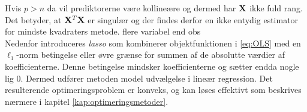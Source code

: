 Hvis \(p > n\) da vil prediktorerne være kollineære og dermed har \(\mathbf{X}\) ikke fuld rang.
Det betyder, at $\mathbf{X}^T \mathbf{X}$ er singulær og der findes derfor en ikke entydig estimator for mindste kvadraters metode.
flere variabel end obs \\[4mm]
%
Nedenfor introduceres \textit{lasso} som kombinerer objektfunktionen i \eqref{eq:OLS} med en $\ell_1$-norm betingelse eller øvre grænse for summen af de absolutte værdier af koefficienterne.
Denne betingelse mindsker koefficienterne og sætter endda nogle lig 0. 
Dermed udfører metoden model udvælgelse i lineær regression.
Det resulterende optimeringsproblem er konveks, og kan løses effektivt som beskrives nærmere i kapitel \ref{kap:optimeringsmetoder}.


%




